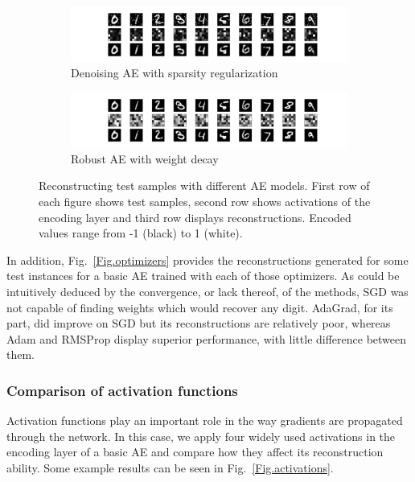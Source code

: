 \documentclass[preprint,5p,compress]{elsarticle}
\begin{document}
\begin{figure}[htbp]
  \begin{subfigure}{0.48\textwidth}
    \includegraphics[width=\textwidth,trim={14em 0 14em 0},clip]{sparse-denoising-36-rmsprop-xent.pdf}
    \caption{\label{Fig.mnist.denoising}Denoising AE with sparsity regularization}
  \end{subfigure}
  \hfill
  \begin{subfigure}{0.48\textwidth}
    \includegraphics[width=\textwidth,trim={14em 0 14em 0},clip]{robust-wd-36-rmsprop-corr.pdf}
    \caption{\label{Fig.mnist.robust}Robust AE with weight decay}
  \end{subfigure}
  \caption{\label{Fig.mnist}Reconstructing test samples with different AE models. First row of each figure shows test samples, second row shows activations of the encoding layer and third row displays reconstructions. Encoded values range from -1 (black) to 1 (white).}
  
\end{figure}

In addition, Fig.~\ref{Fig.optimizers} provides the reconstructions generated for some test instances for a basic AE trained with each of those optimizers. As could be intuitively deduced by the convergence, or lack thereof, of the methods, SGD was not capable of finding weights which would recover any digit. AdaGrad, for its part, did improve on SGD but its reconstructions are relatively poor, whereas Adam and RMSProp display superior performance, with little difference between them.

\subsubsection{Comparison of activation functions}

Activation functions play an important role in the way gradients are propagated through the network. In this case, we apply four widely used activations in the encoding layer of a basic AE and compare how they affect its reconstruction ability. Some example results can be seen in Fig.~\ref{Fig.activations}.
\end{document}
